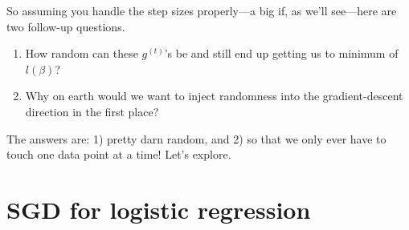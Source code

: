 \documentclass{article}
\begin{document}
So assuming you handle the step sizes properly---a big if, as we'll see---here are two follow-up questions.
\begin{enumerate}
\item How random can these $g^{(t)}$'s be and still end up getting us to minimum of $l(\beta)$? 
\item Why on earth would we want to inject randomness into the gradient-descent direction in the first place?
\end{enumerate}

The answers are: 1) pretty darn random, and 2) so that we only ever have to touch one data point at a time!  Let's explore.

\section{SGD for logistic regression}
\end{document}
